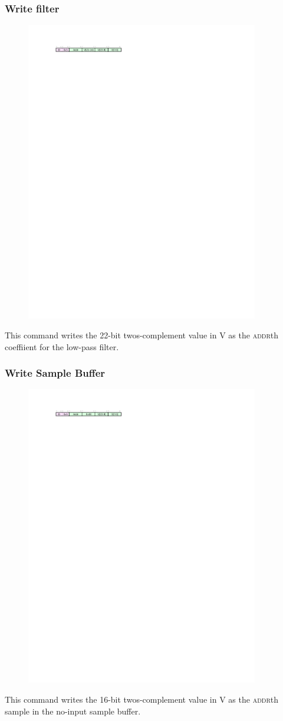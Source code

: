 \subsubsection{Write filter}
\begin{figure}[h!]
\includegraphics[width=4in]{writefil.cmd.svg}
\end{figure}

This command writes the 22-bit twos-complement value in V as the \textsc{addr}th coeffiient for the low-pass filter. 

\subsubsection{Write Sample Buffer}
\begin{figure}[h!]
\includegraphics[width=4in]{writesamp.cmd.svg}
\end{figure}

This command writes the 16-bit twos-complement value in V as the \textsc{addr}th sample in the no-input sample buffer. 





